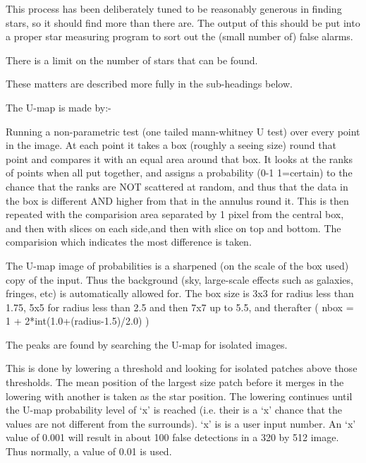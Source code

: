 \begin{small}
{{ This process has been deliberately tuned to be reasonably generous
 in finding stars, so it should find more than there are. The output
 of this should be put into a proper star measuring program to
 sort out the (small number of) false alarms.

 There is a limit on the number of stars that can be found.

 These matters are described more fully in the sub-headings below.


 \vspace*{1mm}
 \hspace*{2em}{\bf U-Map}
 \vspace*{1mm}

  The U-map is made by:-

 Running a non-parametric test (one tailed mann-whitney U test)
 over every point in the image. At each point it takes a box
 (roughly a seeing size) round that point and compares it with
 an equal area around that box. It looks at the ranks of points
 when all put together, and assigns a probability
 (0-1 1=certain) to the chance that the ranks are NOT scattered
 at random, and thus that the data in the box is different
 AND higher from that in the annulus round it. This is then
 repeated with the comparision area separated by 1 pixel from
 the central box, and then with slices on each side,and then
 with slice on top and bottom. The comparision which indicates
 the most difference is taken.

 The U-map image of probabilities is a sharpened (on the scale
 of the box used) copy of the input. Thus the background (sky,
 large-scale effects such as galaxies, fringes, etc) is
 automatically allowed for. The box size is 3x3 for radius less
 than 1.75, 5x5 for radius less than 2.5 and then 7x7 up to 5.5,
 and therafter  ( nbox = 1 + 2*int(1.0+(radius-1.5)/2.0) )

 \vspace*{1mm}
 \hspace*{2em}{\bf Peaks}
 \vspace*{1mm}

 The peaks are found by searching the U-map for isolated images.

 This is done
    by lowering a threshold and looking for isolated patches
    above those thresholds. The mean position of the largest size
    patch before it merges in the lowering with another is taken
    as the star position. The lowering continues until the U-map
    probability level of `x' is reached (i.e. their is a `x' chance
    that the values are not different from the surrounds). `x' is
    is a user input number. An `x' value of 0.001 will result in
    about 100 false detections in a 320 by 512 image. Thus
    normally, a value of 0.01 is used.

}}
\end{small}
